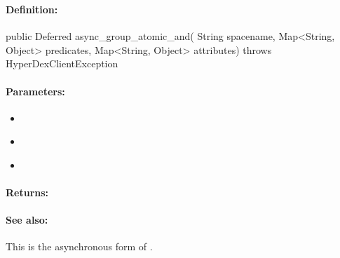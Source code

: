 \pagebreak
\subsubsection{}
\label{api:java:async_group_atomic_and}


\paragraph{Definition:}
\begin{javacode}
public Deferred async_group_atomic_and(
        String spacename,
        Map<String, Object> predicates,
        Map<String, Object> attributes) throws HyperDexClientException
\end{javacode}

\paragraph{Parameters:}
\begin{itemize}[noitemsep]
\item {}\\

\item {}\\

\item {}\\

\end{itemize}

\paragraph{Returns:}


\paragraph{See also:}  This is the asynchronous form of .

\pagebreak
\subsubsection{}
\label{api:java:atomic_or}


